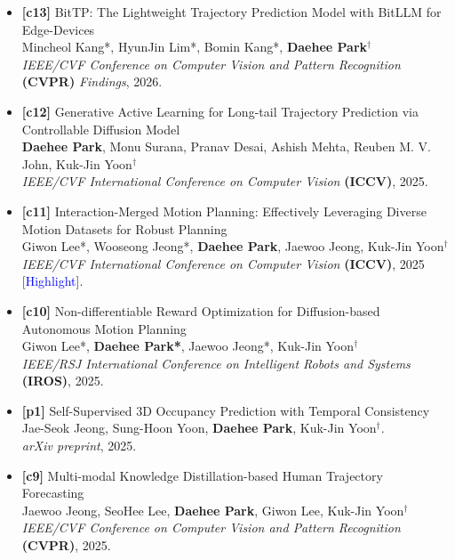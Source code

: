 \documentclass[a4paper,11pt]{article}
\begin{document}
\begin{itemize}[leftmargin=0.25cm]
\item \textbf{[c13]} BitTP: The Lightweight Trajectory Prediction Model with BitLLM for Edge-Devices\\
Mincheol Kang*, HyunJin Lim*, Bomin Kang*, \textbf{Daehee Park$^\dagger$}\\
\textit{IEEE/CVF Conference on Computer Vision and Pattern Recognition} \textbf{(CVPR)} \textit{Findings}, 2026.

\item \textbf{[c12]} Generative Active Learning for Long-tail Trajectory Prediction via Controllable Diffusion Model\\
\textbf{Daehee Park}, Monu Surana, Pranav Desai, Ashish Mehta, Reuben M. V. John, Kuk-Jin Yoon$^\dagger$\\
\textit{IEEE/CVF International Conference on Computer Vision} \textbf{(ICCV)}, 2025.

\item \textbf{[c11]} Interaction-Merged Motion Planning: Effectively Leveraging Diverse Motion Datasets for Robust Planning\\
Giwon Lee*, Wooseong Jeong*, \textbf{Daehee Park}, Jaewoo Jeong, Kuk-Jin Yoon$^\dagger$\\
\textit{IEEE/CVF International Conference on Computer Vision} \textbf{(ICCV)}, 2025 [\textcolor{blue}{Highlight}].

\item \textbf{[c10]} Non-differentiable Reward Optimization for Diffusion-based Autonomous Motion Planning\\
Giwon Lee*, \textbf{Daehee Park*}, Jaewoo Jeong*, Kuk-Jin Yoon$^\dagger$\\
\textit{IEEE/RSJ International Conference on Intelligent Robots and Systems} \textbf{(IROS)}, 2025.

\item \textbf{[p1]} Self-Supervised 3D Occupancy Prediction with Temporal Consistency\\
Jae-Seok Jeong, Sung-Hoon Yoon, \textbf{Daehee Park}, Kuk-Jin Yoon$^\dagger$.\\
\textit{arXiv preprint}, 2025.

\item \textbf{[c9]} Multi-modal Knowledge Distillation-based Human Trajectory Forecasting\\
Jaewoo Jeong, SeoHee Lee, \textbf{Daehee Park}, Giwon Lee, Kuk-Jin Yoon$^\dagger$\\
\textit{IEEE/CVF Conference on Computer Vision and Pattern Recognition} \textbf{(CVPR)}, 2025.


\end{itemize}
\end{document}
